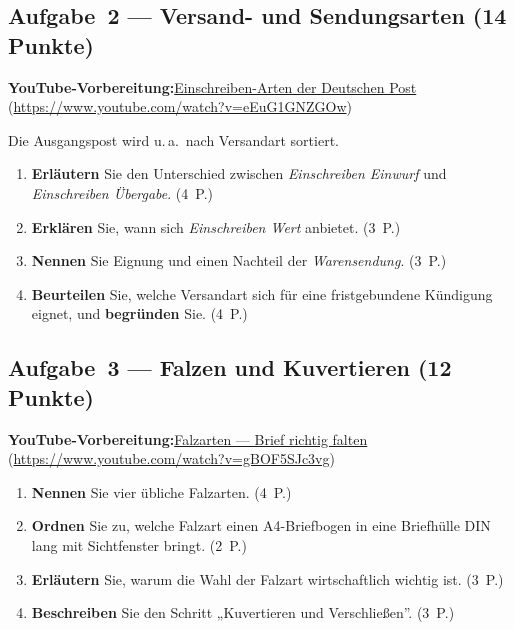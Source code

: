 \documentclass[11pt, a4paper]{article}
\begin{document}
\subsection*{Aufgabe~2 --- Versand- und Sendungsarten (14 Punkte)}

\noindent\textbf{\color{bfwAccent}YouTube-Vorbereitung:}\enspace \href{https://www.youtube.com/watch?v=eEuG1GNZGOw}{Einschreiben-Arten der Deutschen Post} (\url{https://www.youtube.com/watch?v=eEuG1GNZGOw})

\medskip
Die Ausgangspost wird u.\,a.\ nach Versandart sortiert.

\begin{enumerate}[label=(\alph*)]
  \item \textbf{Erläutern} Sie den Unterschied zwischen \emph{Einschreiben Einwurf} und \emph{Einschreiben Übergabe}. \hfill (4~P.)
  \item \textbf{Erklären} Sie, wann sich \emph{Einschreiben Wert} anbietet. \hfill (3~P.)
  \item \textbf{Nennen} Sie Eignung und einen Nachteil der \emph{Warensendung}. \hfill (3~P.)
  \item \textbf{Beurteilen} Sie, welche Versandart sich für eine fristgebundene Kündigung eignet, und \textbf{begründen} Sie. \hfill (4~P.)
\end{enumerate}

\subsection*{Aufgabe~3 --- Falzen und Kuvertieren (12 Punkte)}

\noindent\textbf{\color{bfwAccent}YouTube-Vorbereitung:}\enspace \href{https://www.youtube.com/watch?v=gBOF5SJc3vg}{Falzarten --- Brief richtig falten} (\url{https://www.youtube.com/watch?v=gBOF5SJc3vg})

\medskip
\begin{enumerate}[label=(\alph*)]
  \item \textbf{Nennen} Sie vier übliche Falzarten. \hfill (4~P.)
  \item \textbf{Ordnen} Sie zu, welche Falzart einen A4-Briefbogen in eine Briefhülle DIN lang mit Sichtfenster bringt. \hfill (2~P.)
  \item \textbf{Erläutern} Sie, warum die Wahl der Falzart wirtschaftlich wichtig ist. \hfill (3~P.)
  \item \textbf{Beschreiben} Sie den Schritt „Kuvertieren und Verschließen”. \hfill (3~P.)
\end{enumerate}
\end{document}

